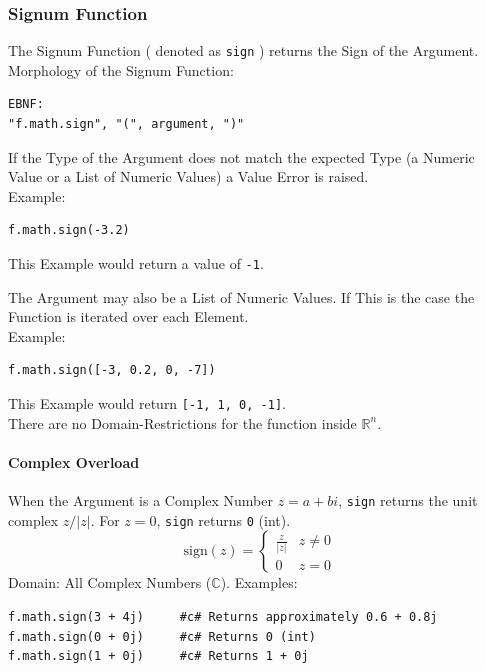 \subsubsection{Signum Function}
The Signum Function ( denoted as \texttt{sign} ) returns the Sign of the Argument. \\
Morphology of the Signum Function:
\begin{verbatim}
EBNF:
"f.math.sign", "(", argument, ")"
\end{verbatim}
If the Type of the Argument does not match the expected Type (a Numeric Value or a List of Numeric Values) a Value Error is raised.\\
Example:
\begin{verbatim}
f.math.sign(-3.2)
\end{verbatim}
This Example would return a value of \texttt{-1}.

The Argument may also be a List of Numeric Values. If This is the case the Function is iterated over each Element.\\
Example:
\begin{verbatim}
f.math.sign([-3, 0.2, 0, -7])
\end{verbatim}
This Example would return \texttt{[-1, 1, 0, -1]}.\\
There are no Domain-Restrictions for the function inside $\mathbb{R}^n$.

\paragraph{Complex Overload}
When the Argument is a Complex Number $z = a + bi$, \texttt{sign} returns the unit complex $z / |z|$. For $z = 0$, \texttt{sign} returns \texttt{0} (int).
\[
\text{sign}(z) = \begin{cases} \frac{z}{|z|} & z \neq 0 \\ 0 & z = 0 \end{cases}
\]
Domain: All Complex Numbers ($\mathbb{C}$).
Examples:
\begin{verbatim}
f.math.sign(3 + 4j)     #c# Returns approximately 0.6 + 0.8j
f.math.sign(0 + 0j)     #c# Returns 0 (int)
f.math.sign(1 + 0j)     #c# Returns 1 + 0j
\end{verbatim}

